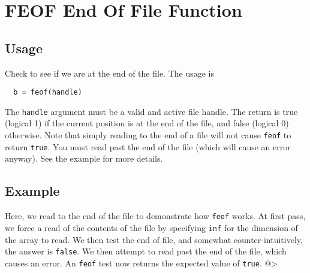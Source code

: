 \section{FEOF End Of File Function}

\subsection{Usage}

Check to see if we are at the end of the file.  The usage is
\begin{verbatim}
  b = feof(handle)
\end{verbatim}
The \verb|handle| argument must be a valid and active file handle.  The
return is true (logical 1) if the current position is at the end of
the file, and false (logical 0) otherwise.  Note that simply reading
to the end of a file will not cause \verb|feof| to return \verb|true|.  
You must read past the end of the file (which will cause an error 
anyway).  See the example for more details.
\subsection{Example}

Here, we read to the end of the file to demonstrate how \verb|feof| works.
At first pass, we force a read of the contents of the file by specifying
\verb|inf| for the dimension of the array to read.  We then test the
end of file, and somewhat counter-intuitively, the answer is \verb|false|.
We then attempt to read past the end of the file, which causes an
error.  An \verb|feof| test now returns the expected value of \verb|true|.
@>
